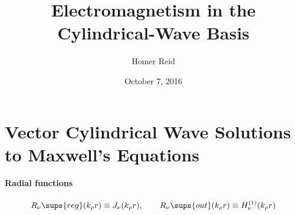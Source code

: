 \documentclass[letterpaper]{article}
\title {Electromagnetism in the Cylindrical-Wave Basis
       }
\author {Homer Reid}
\date {October 7, 2016}
\begin{document}
\pagestyle{myheadings}
\maketitle

\tableofcontents

\newpage
\section{Vector Cylindrical Wave Solutions to Maxwell's Equations}
\label{CylindricalWaveSection}

\paragraph{Radial functions}
\begin{align*}
 R_\nu\sups{reg}(k_\rho r)\equiv J_\nu(k_\rho r), \qquad
 R_\nu\sups{out}(k_\rho r)\equiv H^{(1)}_\nu(k_\rho r)
\end{align*}

\end{document}
